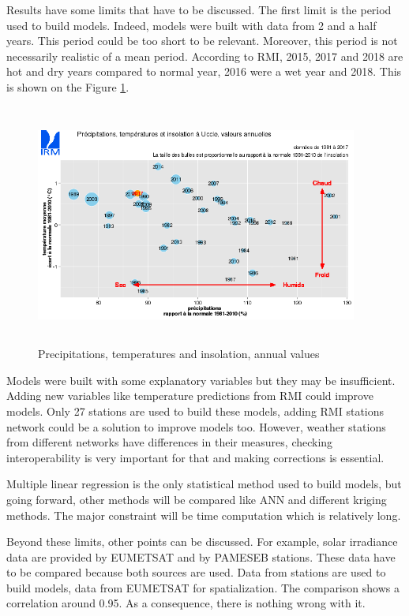 \documentclass[12pt,twoside]{reedthesis}
\theoremstyle{definition}
\theoremstyle{definition}
\theoremstyle{definition}
\theoremstyle{remark}
\begin{document}
Results have some limits that have to be discussed. The first limit is
the period used to build models. Indeed, models were built with data
from 2 and a half years. This period could be too short to be relevant.
Moreover, this period is not necessarily realistic of a mean period.
According to RMI, 2015, 2017 and 2018 are hot and dry years compared to
normal year, 2016 were a wet year and 2018. This is shown on the Figure
\ref{fig:rmi}.
\begin{figure}

{\centering \includegraphics[width=400px,height=300px]{figure/rmi_climate_data} 

}

\caption{Precipitations, temperatures and insolation, annual values}\label{fig:rmi}
\end{figure}
Models were built with some explanatory variables but they may be
insufficient. Adding new variables like temperature predictions from RMI
could improve models. Only 27 stations are used to build these models,
adding RMI stations network could be a solution to improve models too.
However, weather stations from different networks have differences in
their measures, checking interoperability is very important for that and
making corrections is essential.

Multiple linear regression is the only statistical method used to build
models, but going forward, other methods will be compared like ANN and
different kriging methods. The major constraint will be time computation
which is relatively long.

Beyond these limits, other points can be discussed. For example, solar
irradiance data are provided by EUMETSAT and by PAMESEB stations. These
data have to be compared because both sources are used. Data from
stations are used to build models, data from EUMETSAT for
spatialization. The comparison shows a correlation around 0.95. As a
consequence, there is nothing wrong with it.
\end{document}
